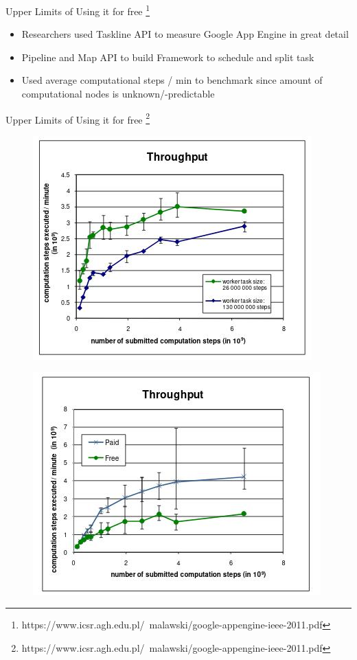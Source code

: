 \documentclass{beamer}
\begin{document}
\begin{frame}{Upper Limits of Using it for free  \footnote{https://www.icsr.agh.edu.pl/~malawski/google-appengine-ieee-2011.pdf}}
	\begin{itemize}
			\item Researchers used Taskline API to measure Google App Engine in great detail
		\item  Pipeline and Map API to build Framework to schedule and split task
		\item Used average computational steps / min to benchmark since amount of computational nodes is unknown/-predictable
		
	\end{itemize}

\end{frame}
	\begin{frame}{Upper Limits of Using it for free \footnote{https://www.icsr.agh.edu.pl/~malawski/google-appengine-ieee-2011.pdf}}
		\begin{figure}
			\centering
			\includegraphics[width=0.7\linewidth]{Throughput}
		
			\label{fig:throughput}
		\end{figure}
	\end{frame}
\begin{frame}


	\begin{figure}
		\centering
		\includegraphics[width=0.7\linewidth]{Throughput2}
	
		\label{}
	\end{figure}
\end{frame}
\end{document}
